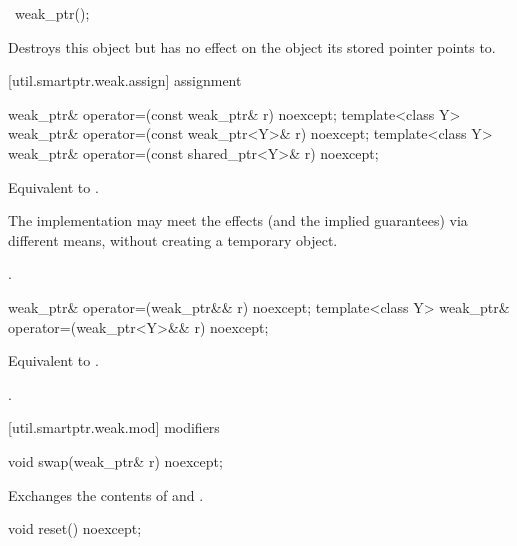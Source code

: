 %
\begin{itemdecl}
~weak_ptr();
\end{itemdecl}

\begin{itemdescr}
\pnum\effects  Destroys this  object but has no
effect on the object its stored pointer points to.
\end{itemdescr}

[util.smartptr.weak.assign]{ assignment}

%
\begin{itemdecl}
weak_ptr& operator=(const weak_ptr& r) noexcept;
template<class Y> weak_ptr& operator=(const weak_ptr<Y>& r) noexcept;
template<class Y> weak_ptr& operator=(const shared_ptr<Y>& r) noexcept;
\end{itemdecl}

\begin{itemdescr}
\pnum\effects  Equivalent to .

\pnum\remarks  The implementation may meet the effects (and the
implied guarantees) via different means, without creating a temporary object.

\pnum\returns  {}.
\end{itemdescr}

%
\begin{itemdecl}
weak_ptr& operator=(weak_ptr&& r) noexcept;
template<class Y> weak_ptr& operator=(weak_ptr<Y>&& r) noexcept;
\end{itemdecl}

\begin{itemdescr}
\pnum\effects  Equivalent to .

\pnum\returns  {}.
\end{itemdescr}

[util.smartptr.weak.mod]{ modifiers}
%
\begin{itemdecl}
void swap(weak_ptr& r) noexcept;
\end{itemdecl}

\begin{itemdescr}
\pnum\effects  Exchanges the contents of  and .
\end{itemdescr}

%
\begin{itemdecl}
void reset() noexcept;
\end{itemdecl}

